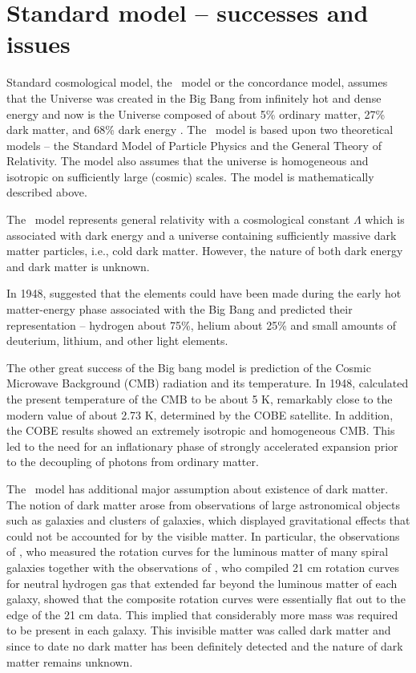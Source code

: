 \section{Standard \LCDM model -- successes and issues}

Standard cosmological model, the \LCDM\ model or the concordance model, assumes that the Universe was created in the Big Bang from infinitely hot and dense energy and now is the Universe composed of about 5\% ordinary matter, 27\% dark matter, and 68\% dark energy \parencite{redefineLCDM}. The \LCDM\ model is based upon two theoretical models -- the Standard Model of Particle Physics and  the General Theory of Relativity. The model also assumes that the universe is homogeneous and isotropic on sufficiently large (cosmic) scales. The model is mathematically described above.

The \LCDM\ model represents general relativity with a cosmological constant \(\Lambda\) which is associated with dark energy and a universe containing sufficiently massive dark matter particles, i.e., cold dark matter. However, the nature of both dark energy and dark matter is unknown.

In 1948, \textcite{PhysRev.74.505.2} suggested that the elements could have been made during the early hot matter-energy phase associated with the Big Bang and predicted their representation -- hydrogen about 75\%, helium about 25\% and small amounts of deuterium, lithium, and other light elements.

The other great success of the Big bang model is prediction of the Cosmic Microwave Background (CMB) radiation and its temperature. In 1948, \textcite{1948Natur.162..774A} calculated the present temperature of the CMB to be about 5 K, remarkably close to the modern value of about 2.73 K, determined by the COBE satellite. In addition, the COBE results showed an extremely isotropic and homogeneous CMB. This led to the need for an inflationary phase \parencite{1981PhRvD..23..347G} of strongly accelerated expansion prior to the decoupling of photons from ordinary matter.

The \LCDM\ model has additional major assumption about existence of dark matter. The notion of dark matter arose from observations of large astronomical objects such as galaxies and clusters of galaxies, which displayed gravitational effects that could not be accounted for by the visible matter. In particular, the observations of \textcite{1980ApJ...238..471R}, who measured the rotation curves for the luminous matter of many spiral galaxies together with the observations of \textcite{1978PhDT.......195B}, who compiled 21 cm rotation curves for neutral hydrogen gas that extended far beyond the luminous matter of each galaxy, showed that the composite rotation curves were essentially flat out to the edge of the 21 cm data. This implied that considerably more mass was required to be present in each galaxy. This invisible matter was called dark matter and since to date no dark matter has been definitely detected and the nature of dark matter remains unknown.

